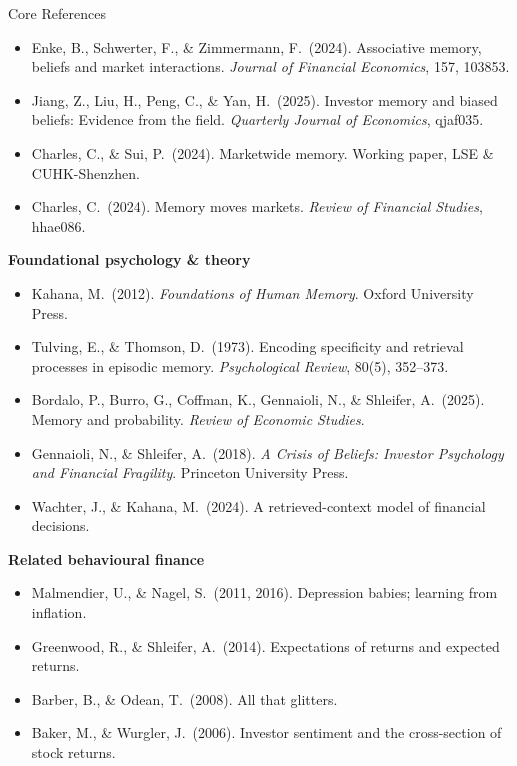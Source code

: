 \documentclass[aspectratio=169, 11pt]{beamer}
\begin{document}
\begin{frame}{Core References}
\scriptsize
\begin{itemize}
\item Enke, B., Schwerter, F., \& Zimmermann, F.\ (2024). Associative memory, beliefs and market interactions. \textit{Journal of Financial Economics}, 157, 103853.
\item Jiang, Z., Liu, H., Peng, C., \& Yan, H.\ (2025). Investor memory and biased beliefs: Evidence from the field. \textit{Quarterly Journal of Economics}, qjaf035.
\item Charles, C., \& Sui, P.\ (2024). Marketwide memory. Working paper, LSE \& CUHK-Shenzhen.
\item Charles, C.\ (2024). Memory moves markets. \textit{Review of Financial Studies}, hhae086.
\end{itemize}
\vspace{0.4em}
\textbf{Foundational psychology \& theory}
\begin{itemize}
\item Kahana, M.\ (2012). \textit{Foundations of Human Memory}. Oxford University Press.
\item Tulving, E., \& Thomson, D.\ (1973). Encoding specificity and retrieval processes in episodic memory. \textit{Psychological Review}, 80(5), 352--373.
\item Bordalo, P., Burro, G., Coffman, K., Gennaioli, N., \& Shleifer, A.\ (2025). Memory and probability. \textit{Review of Economic Studies}.
\item Gennaioli, N., \& Shleifer, A.\ (2018). \textit{A Crisis of Beliefs: Investor Psychology and Financial Fragility}. Princeton University Press.
\item Wachter, J., \& Kahana, M.\ (2024). A retrieved-context model of financial decisions.
\end{itemize}
\vspace{0.3em}
\textbf{Related behavioural finance}
\begin{itemize}
\item Malmendier, U., \& Nagel, S.\ (2011, 2016). Depression babies; learning from inflation.
\item Greenwood, R., \& Shleifer, A.\ (2014). Expectations of returns and expected returns.
\item Barber, B., \& Odean, T.\ (2008). All that glitters.
\item Baker, M., \& Wurgler, J.\ (2006). Investor sentiment and the cross-section of stock returns.
\end{itemize}
\end{frame}
\end{document}
